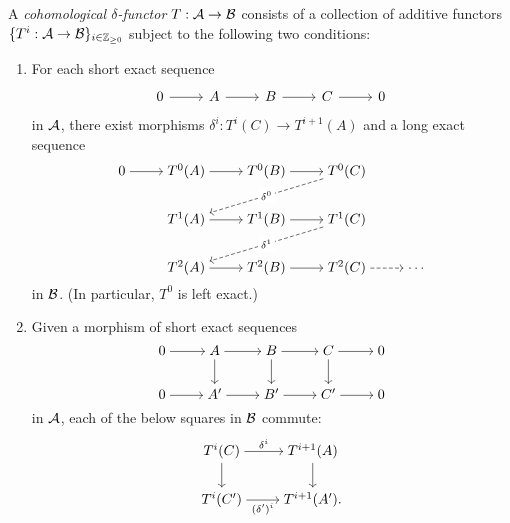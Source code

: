 \begin{definition}
  A \emph{cohomological $\delta$-functor} $T: \mathcal{A} \to
  \mathcal{B}$ consists of a collection of additive functors $\{T^i:
  \mathcal{A} \to \mathcal{B}\}_{i \in \mathbb{Z}_{\geq 0}}$ subject to the following
  two conditions:
  \begin{enumerate}
    \item
      For each short exact sequence
      \[
        \begin{tikzcd}
          0 & A & B & C & 0
          \arrow[from=1-1, to=1-2]
          \arrow[from=1-2, to=1-3]
          \arrow[from=1-3, to=1-4]
          \arrow[from=1-4, to=1-5]
        \end{tikzcd}
      \]
      in $\mathcal{A}$, there exist morphisms $\delta^i: T^i(C) \to
      T^{i + 1}(A)$ and a long exact sequence
      \[
        \begin{tikzcd}[cramped]
          0 & {T^0(A)} & {T^0(B)} & {T^0(C)} \\
          & {T^1(A)} & {T^1(B)} & {T^1(C)} \\
          & {T^2(A)} & {T^2(B)} & {T^2(C)} & \cdots
          \arrow[from=1-1, to=1-2]
          \arrow[from=1-2, to=1-3]
          \arrow[from=1-3, to=1-4]
          \arrow["{\delta^0}"{description}, dashed, from=1-4, to=2-2]
          \arrow[from=2-2, to=2-3]
          \arrow[from=2-3, to=2-4]
          \arrow["{\delta^1}"{description}, dashed, from=2-4, to=3-2]
          \arrow[from=3-2, to=3-3]
          \arrow[from=3-3, to=3-4]
          \arrow[from=3-4, to=3-5, dashed]
        \end{tikzcd}
      \]
      in $\mathcal{B}$.
      (In particular, $T^0$ is left exact.)

    \item
      Given a morphism of short exact sequences
      \[
        \begin{tikzcd}[cramped]
          0 & A & B & C & 0 \\
          0 & {A'} & {B'} & {C'} & 0
          \arrow[from=1-1, to=1-2]
          \arrow[from=1-2, to=1-3]
          \arrow[from=1-2, to=2-2]
          \arrow[from=1-3, to=1-4]
          \arrow[from=1-3, to=2-3]
          \arrow[from=1-4, to=1-5]
          \arrow[from=1-4, to=2-4]
          \arrow[from=2-1, to=2-2]
          \arrow[from=2-2, to=2-3]
          \arrow[from=2-3, to=2-4]
          \arrow[from=2-4, to=2-5]
        \end{tikzcd}
      \]
      in $\mathcal{A}$, each of the below squares in $\mathcal{B}$ commute:
      \[
        \begin{tikzcd}[cramped]
          {T^i(C)} & {T^{i + 1}(A)} \\
          {T^i(C')} & {T^{i + 1}(A')}.
          \arrow["{\delta^i}", from=1-1, to=1-2]
          \arrow[from=1-1, to=2-1]
          \arrow[from=1-2, to=2-2]
          \arrow["{(\delta')^i}"', from=2-1, to=2-2]
        \end{tikzcd}
      \]
  \end{enumerate}
\end{definition}

